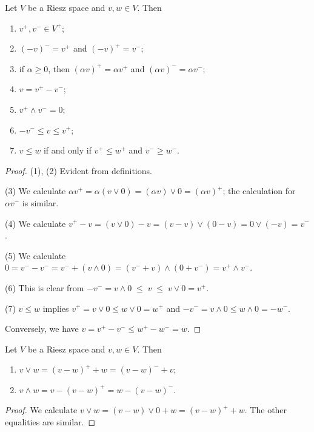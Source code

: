 \begin{lemma} \label{lemma:PositiveNegativeElements}
Let $V$ be a Riesz space and $v,w\in V$. Then
\begin{enumerate}
\item $v^+, v^- \in V^+$;
\item $(-v)^- = v^+$ and $(-v)^+ = v^-$;
\item if $\alpha \geq 0$, then $(\alpha v)^+ = \alpha v^+$ and $(\alpha v)^- = \alpha v^-$;
\item $v= v^+ - v^-$;
\item $v^+ \wedge v^- = 0$;
\item $-v^- \leq v \leq v^+$;
\item $v\leq w$ \textup{if and only if} $v^+ \leq w^+$ and $v^- \geq w^-$.
\end{enumerate}
\end{lemma}
\begin{proof}
(1), (2) Evident from definitions.

(3) We calculate $\alpha v^+ = \alpha (v \vee 0) = (\alpha v) \vee 0 = (\alpha v)^+$; the calculation for $\alpha v^-$ is similar.

(4) We calculate $v^+ - v = (v \vee 0) - v = (v-v) \vee (0-v) = 0\vee (-v) = v^-$.

(5) We calculate $0 = v^- - v^- = v^-  + (v\wedge 0) = (v^- + v)\wedge (0 + v^-) = v^+ \wedge v^-$.

(6) This is clear from $-v^- = v\wedge 0 \;\leq\; v \;\leq\; v \vee 0 = v^+$.

(7) $v\leq w$ implies $v^+ = v\vee 0 \leq w\vee 0 = w^+$ and $-v^- = v\wedge 0 \leq w\wedge 0 = - w^-$.

Conversely, we have $v = v^+ - v^- \leq w^+ - w^- = w$.
\end{proof}

\begin{lemma} \label{lemma:MeetJoinAsPositiveNegative}
Let $V$ be a Riesz space and $v,w\in V$. Then
\begin{enumerate}
\item $v\vee w = (v-w)^+ + w = (v-w)^- + v$;
\item $v\wedge w = v - (v-w)^+ = w - (v-w)^-$.
\end{enumerate}
\end{lemma}
\begin{proof}
We calculate $v\vee w = (v-w)\vee 0 + w = (v-w)^+ + w$. The other equalities are similar.
\end{proof}

